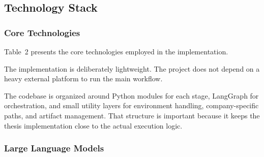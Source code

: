 \subsection{Technology Stack}

\subsubsection{Core Technologies}

Table~2 presents the core technologies employed in the implementation.


The implementation is deliberately lightweight. The project does not depend on a heavy external platform to run the main workflow.

The codebase is organized around Python modules for each stage, LangGraph for orchestration, and small utility layers for environment handling, company-specific paths, and artifact management. That structure is important because it keeps the thesis implementation close to the actual execution logic.

\subsubsection{Large Language Models}

